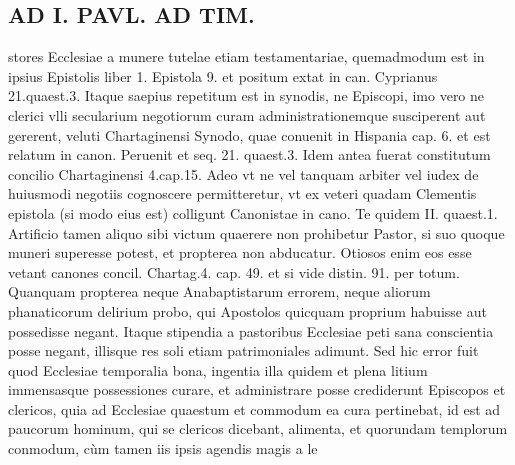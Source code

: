\documentclass{article}
\begin{document}
\begin{pages}
\section*{AD I. PAVL. AD TIM. }
\marginpar{[ p.1 Q ]}\pstart stores Ecclesiae a munere tutelae etiam testamentariae, quemadmodum est in ipsius Epistolis liber  1. Epistola 9. et positum extat in can. Cyprianus 21.quaest.3. Itaque saepius repetitum est in synodis, ne Episcopi, imo vero ne clerici vlli secularium negotiorum curam administrationemque susciperent aut gererent, veluti Chartaginensi Synodo, quae conuenit in Hispania cap. 6. et est relatum in canon. Peruenit et seq. 21. quaest.3. Idem antea fuerat constitutum concilio Chartaginensi 4.cap.15. Adeo vt ne vel tanquam arbiter vel iudex de huiusmodi negotiis cognoscere permitteretur, vt ex veteri quadam Clementis epistola (si modo eius est) colligunt Canonistae in cano. Te quidem II. quaest.1. Artificio tamen aliquo sibi victum quaerere non prohibetur Pastor, si suo quoque  muneri superesse potest, et propterea non abducatur. Otiosos enim eos esse vetant canones concil. Chartag.4. cap. 49. et si vide distin. 91. per totum. Quanquam propterea neque Anabaptistarum errorem, neque aliorum phanaticorum delirium probo, qui Apostolos quicquam proprium habuisse aut possedisse negant. Itaque stipendia a pastoribus Ecclesiae peti sana conscientia posse negant, illisque res soli etiam patrimoniales adimunt. Sed hic error fuit quod Ecclesiae temporalia bona, ingentia illa quidem et plena litium immensasque possessiones curare, et administrare posse crediderunt Episcopos et clericos, quia ad Ecclesiae quaestum et commodum ea cura pertinebat, id est ad paucorum hominum, qui se clericos dicebant, alimenta, et quorundam templorum conmodum, cùm tamen iis ipsis agendis magis a le\pend

\end{pages}
\end{document}
